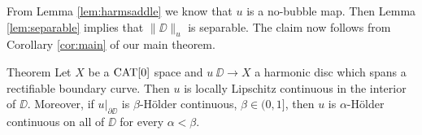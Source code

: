 \documentclass[a4paper,10pt]{amsart}
\begin{document}
From Lemma \ref{lem:harmsaddle} we know that $u$ is a no-bubble map. Then Lemma \ref{lem:separable} implies that 
$\|\DD\|_u$ is separable. The claim now follows from Corollary \ref{cor:main} of our main theorem.

\qeds



\begin{thm}{Theorem}\label{thm:Lipregularity}
Let $X$ be a $\mathop{\rm CAT}\nolimits[0]$ space 
and $u\:\DD\to X$ a harmonic disc which spans a rectifiable boundary curve. 
Then $u$ is locally Lipschitz continuous in the interior of $\DD$. 
Moreover, if $u|_{\partial\DD}$ is $\beta$-H\"older continuous, $\beta\in(0,1]$, then $u$ is $\alpha$-H\"older continuous on all of
$\DD$ for every $\alpha<\beta$.
\end{thm}
\end{document}

